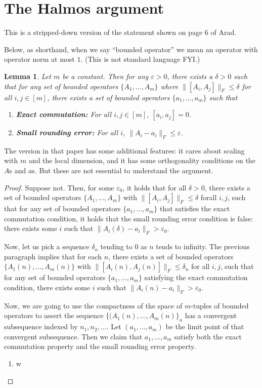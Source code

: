 \documentclass[12pt]{article}
\theoremstyle{plain}
\newtheorem{lemma}[theorem]{Lemma}
\newcommand{\eps}{\varepsilon}
\begin{document}
\section{The Halmos argument}
This is a stripped-down version of the statement shown on page 6 of Arad.

Below, as shorthand, when we say ``bounded operator'' we mean an operator with operator norm at most $1$. (This is not standard language FYI.)
\begin{lemma}
    Let $m$ be a constant. Then for any $\eps > 0$, there exists a $\delta > 0$ such that for any set of bounded operators $\{A_1, \dots, A_m\}$ where $\| [A_i, A_j] \|_F \leq \delta$ for all $i,j \in [m]$, there exists a set of bounded operators $\{a_1, \dots, a_m\}$ such that
    \begin{enumerate}
        \item \textbf{Exact commutation:} For all $i,j \in [m]$, $[a_i, a_j] = 0$.
        \item \textbf{Small rounding error:} For all $i$, $\| A_i - a_i \|_F \leq \eps$.
    \end{enumerate}
\end{lemma}
The version in that paper has some additional features: it cares about scaling with $m$ and the local dimension, and it has some orthogonality conditions on the $A$s and $a$s. But these are not essential to understand the argument.
\begin{proof}
Suppose not. Then, for some $\eps_0$, it holds that for all $\delta > 0$, there exists a set of bounded operators $\{A_1, \dots, A_m\}$ with $\| [A_i, A_j] \|_F \leq \delta$ forall $i,j$, such that for any set of bounded operators $\{a_1, \dots, a_m\}$ that satisfies the exact commutation condition, it holds that the small rounding error condition is false: there exists some $i$ such that $\|A_i(\delta) - a_i \|_F > \eps_0$. 

Now, let us pick a sequence $\delta_n$ tending to $0$ as $n$ tends to infinity. The previous paragraph implies that for each $n$, there exists a set of bounded operators $\{A_1(n), \dots, A_m(n) \}$ with $\|[A_i(n), A_j(n)] \|_F \leq \delta_n$ for all $i,j$, such that for any set of bounded operators $\{a_1, \dots, a_m\}$ satisfying the exact commutation condition, there exists some $i$ such that $\|A_i(n) - a_i\|_F > \eps_0$.

Now, we are going to use the compactness of the space of $m$-tuples of bounded operators to assert the sequence $\{(A_1(n), \dots, A_m(n)\}_n$ has a convergent subsequence indexed by $n_1, n_2, \dots$. Let $(a_1, \dots, a_m)$ be the limit point of that convergent subsequence. Then we claim that $a_1, \dots, a_m$ satisfy both the exact commutation property and the small rounding error property.
\begin{enumerate}
    \item w
\end{enumerate}
\end{proof}

\printbibliography
\end{document}
